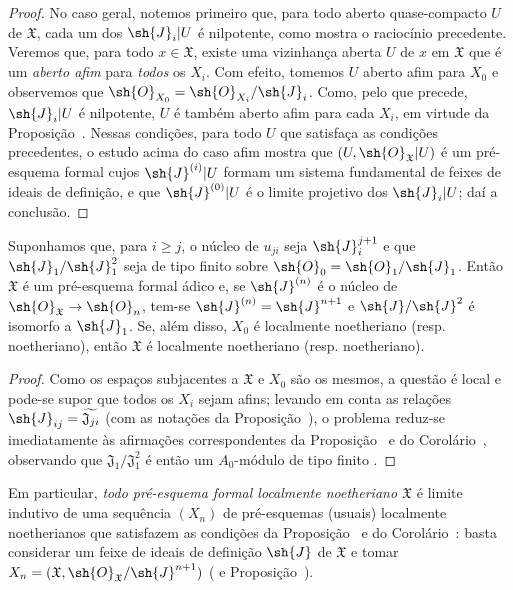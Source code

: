 \documentclass[oneside]{amsart}
\makeatletter
\renewcommand{\geq}{\geqslant}
\newcommand{\ega@arrow}[2]{\mathchoice{#1}{#2}{#2}{#2}}
\renewcommand{\to}{\ega@arrow{\longrightarrow}{\rightarrow}}
\newcommand{\oldpage}[2][]{{\marginnote{\normalfont\textbf{#1}~|~#2}}\ignorespaces}
\let\EGAOriginalLabel\label
\renewcommand{\label}[1]{\phantomsection\EGAOriginalLabel{#1}}
\makeatother
\begin{document}
\begin{proof}
No caso geral, notemos primeiro que, para todo aberto quase-compacto $U$ de $\mathfrak{X}$, cada um dos $\sh{J}_i|U$ é nilpotente, como mostra o raciocínio precedente.
Veremos que, para todo $x\in\mathfrak{X}$, existe uma vizinhança aberta $U$ de $x$ em $\mathfrak{X}$ que é um \emph{aberto afim} para \emph{todos} os $X_i$.
Com efeito, tomemos $U$ aberto afim para $X_0$ e observemos que $\sh{O}_{X_0}=\sh{O}_{X_i}/\sh{J}_i$.
Como, pelo que precede, $\sh{J}_i|U$ é nilpotente, $U$ é também aberto afim para cada $X_i$, em virtude da Proposição~.
Nessas condições, para todo $U$ que satisfaça as condições precedentes, o estudo acima do caso afim mostra que $(U,\sh{O}_\mathfrak{X}|U)$ é um pré-esquema formal cujos $\sh{J}^{(i)}|U$ formam um sistema fundamental de feixes de ideais de definição, e que $\sh{J}^{(0)}|U$ é o limite projetivo dos $\sh{J}_i|U$; daí a conclusão.
\end{proof}

\begin{corollary}[10.6.4]
\label{I.10.6.4}
Suponhamos que, para $i\geq j$, o núcleo de $u_{ji}$ seja $\sh{J}_i^{j+1}$ e que $\sh{J}_1/\sh{J}_1^2$
\oldpage[I]{191}
seja de tipo finito sobre $\sh{O}_0=\sh{O}_1/\sh{J}_1$.
Então $\mathfrak{X}$ é um pré-esquema formal ádico e, se $\sh{J}^{(n)}$ é o núcleo de $\sh{O}_\mathfrak{X}\to\sh{O}_n$, tem-se $\sh{J}^{(n)}=\sh{J}^{n+1}$ e $\sh{J}/\sh{J}^2$ é isomorfo a $\sh{J}_1$.
Se, além disso, $X_0$ é localmente noetheriano (resp. noetheriano), então $\mathfrak{X}$ é localmente noetheriano (resp. noetheriano).
\end{corollary}

\begin{proof}
Como os espaços subjacentes a $\mathfrak{X}$ e $X_0$ são os mesmos, a questão é local e pode-se supor que todos os $X_i$ sejam afins; levando em conta as relações $\sh{J}_{ij}=\widetilde{\mathfrak{J}_{ji}}$ (com as notações da Proposição~), o problema reduz-se imediatamente às afirmações correspondentes da Proposição~ e do Corolário~, observando que $\mathfrak{J}_1/\mathfrak{J}_1^2$ é então um $A_0$-módulo de tipo finito .
\end{proof}

Em particular, \emph{todo pré-esquema formal localmente noetheriano $\mathfrak{X}$} é limite indutivo de uma sequência $(X_n)$ de pré-esquemas (usuais) localmente noetherianos que satisfazem as condições da Proposição~ e do Corolário~: basta considerar um feixe de ideais de definição $\sh{J}$ de $\mathfrak{X}$  e tomar $X_n=(\mathfrak{X},\sh{O}_\mathfrak{X}/\sh{J}^{n+1})$ ( e Proposição~).
\end{document}
